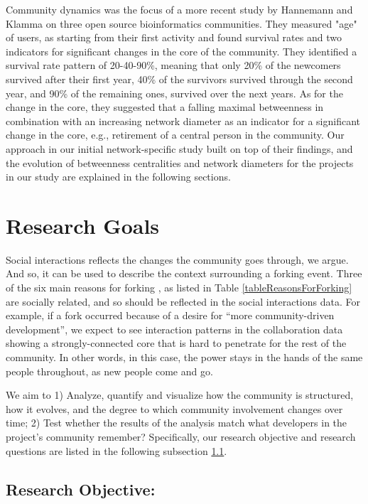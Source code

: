 \documentclass{acm_proc_article-sp}
\begin{document}
Community dynamics was the focus of a more recent study by Hannemann and Klamma \cite{Hannemann} on three open source bioinformatics communities. They measured "age" of users, as starting from their first activity and found survival rates and two indicators for significant changes in the core of the community. They identified a survival rate pattern of 20-40-90\%, meaning that only 20\% of the newcomers survived after their first year, 40\% of the survivors survived through the second year, and 90\% of the remaining ones, survived over the next years. As for the change in the core, they suggested that a falling maximal betweenness in combination with an increasing network diameter as an indicator for a significant change in the core, e.g., retirement of a central person in the community. Our approach in our initial network-specific study built on top of their findings, and the evolution of betweenness centralities and network diameters for the projects in our study are explained in the following sections.


\section{Research Goals}
\label{ResearchGoals}

Social interactions reflects the changes the community goes through, we argue. And so, it can be used to describe the context surrounding a forking event. Three of the six main reasons for forking \cite{Robles}, as listed in Table \ref{tableReasonsForForking} are socially related, and so should be reflected in the social interactions data. For example, if a fork occurred because of a desire for ``more community-driven development'', we expect to see interaction patterns in the collaboration data showing a strongly-connected core that is hard to penetrate for the rest of the community. In other words, in this case, the power stays in the hands of the same people throughout, as new people come and go. 

We aim to 1) Analyze, quantify and visualize how the community is structured, how it evolves, and the degree to which community involvement changes over time; 2) Test whether the results of the analysis match what developers in the project's community remember? 
Specifically, our research objective and research questions are listed in the following subsection \ref{ResearchObjective}.

\subsection{Research Objective:}
\label{ResearchObjective}
\end{document}
